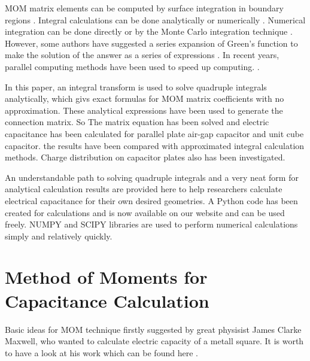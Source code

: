 \documentclass[final,5p,times,twocolumn]{elsarticle}
\begin{document}
MOM matrix elements can be computed by surface integration in boundary regions \cite {Tao2010}. Integral calculations can be done analytically \cite {Arcioni1997, Eibert1995, Wilton1984} or numerically \cite {Graglia1993, Rao1979}. Numerical integration can be done directly or by the Monte Carlo integration technique \cite {Mishra2009}. However, some authors have suggested a series expansion of Green's function to make the solution of the answer as a series of expressions \cite {Ayatollahi2003, Zhang2016, Hu2018, See2009}. In recent years, parallel computing methods have been used to speed up computing. \cite{Kolundzija2012, Manic2015}.

In this paper, an integral transform is used to solve quadruple integrals analytically, which givs exact formulas for MOM matrix coefficients with no approximation. These analytical expressions have been used to generate the connection matrix. So The matrix equation has been solved and electric capacitance has been calculated for parallel plate air-gap capacitor and unit cube capacitor. the results have been compared with approximated integral calculation methods. Charge distribution on capacitor plates also has been investigated.

An understandable path to solving quadruple integrals and a very neat form for analytical calculation results are provided here to help researchers calculate electrical capacitance for their own desired geometries. A Python code has been created for calculations and is now available on our website and can be used freely. NUMPY and SCIPY libraries are used to perform numerical calculations simply and relatively quickly.
\section{Method of Moments for Capacitance Calculation}

Basic ideas for MOM technique firstly suggested by great physisist James Clarke Maxwell, who wanted to calculate electric capacity of a metall square. It is worth to have a look at his work which can be found here \cite {Cavendish1967}.
\end{document}
